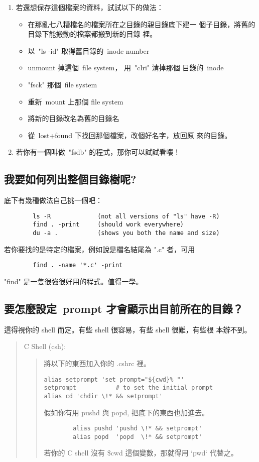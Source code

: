 \documentclass{article}
\begin{document}
\begin{CJK*}{Bg5}{ming}
\begin{enumerate}
	\item 若還想保存這個檔案的資料，試試以下的做法：
	\begin{itemize}
	   \item 在那亂七八糟檔名的檔案所在之目錄的親目錄底下建一
	    個子目錄，將舊的目錄下能搬動的檔案都搬到新的目錄
	    裡。
	   \item 以~"ls -id" 取得舊目錄的~inode number
	   \item unmount 掉這個~file system， 用~"clri" 清掉那個
	    目錄的~inode
	   \item "fsck" 那個~file system
	   \item 重新~mount 上那個 file system
	   \item 將新的目錄改名為舊的目錄名
	   \item 從~lost+found 下找回那個檔案，改個好名字，放回原
	    來的目錄。
	\end{itemize}

	\item 若你有一個叫做~"fsdb" 的程式，那你可以試試看嘍！
	\end{enumerate}

\subsection{我要如何列出整個目錄樹呢?}

	底下有幾種做法自己挑一個吧：
\begin{verbatim}
        ls -R             (not all versions of "ls" have -R)
        find . -print     (should work everywhere)
        du -a .           (shows you both the name and size)
\end{verbatim}

	若你要找的是特定的檔案，例如說是檔名結尾為 ".c" 者，可用
\begin{verbatim}
        find . -name '*.c' -print
\end{verbatim}
	"find" 是一隻很強很好用的程式。值得一學。

\subsection{要怎麼設定~prompt 才會顯示出目前所在的目錄？}
	
	這得視你的 shell 而定。有些 shell 很容易，有些 shell 很難，有些根
	本辦不到。
\begin{quote}
	C Shell (csh):
	\begin{quote}
	  將以下的東西加入你的 .cshrc 裡。
\begin{verbatim}
alias setprompt 'set prompt="${cwd}% "'
setprompt           # to set the initial prompt
alias cd 'chdir \!* && setprompt'
\end{verbatim}
	  假如你有用 pushd 與 popd, 把底下的東西也加進去。
\begin{verbatim}
		alias pushd 'pushd \!* && setprompt'
		alias popd  'popd  \!* && setprompt'
\end{verbatim}
	  若你的 C shell 沒有 \$cwd 這個變數，那就得用 `pwd` 代替之。


\end{quote}
\end{quote}
\end{CJK*}
\end{document}
